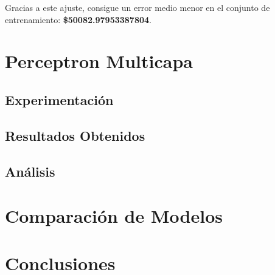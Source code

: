 \documentclass{uc3mpracticas}
\begin{document}
      Gracias a este ajuste, consigue un error medio menor en el conjunto de entrenamiento: \textbf{\$50082.97953387804}.

  \section{Perceptron Multicapa}

    \subsection{Experimentación}

    \subsection{Resultados Obtenidos}

    \subsection{Análisis}

  \section{Comparación de Modelos}

  \section{Conclusiones}
\end{document}
